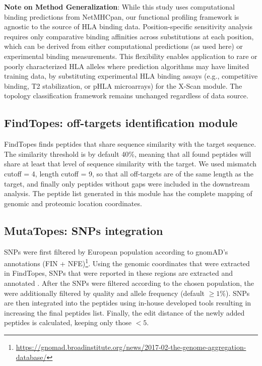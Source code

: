 \documentclass[unnumsec,webpdf,contemporary,large]{oup-authoring-template}%
\theoremstyle{thmstyleone}%
\theoremstyle{thmstyletwo}%
\theoremstyle{thmstylethree}%
\begin{document}
        \textbf{Note on Method Generalization}: While this study uses computational binding predictions from NetMHCpan, our functional profiling framework is agnostic to the source of HLA binding data. Position-specific sensitivity analysis requires only comparative binding affinities across substitutions at each position, which can be derived from either computational predictions (as used here) or experimental binding measurements. This flexibility enables application to rare or poorly characterized HLA alleles where prediction algorithms may have limited training data, by substituting experimental HLA binding assays (e.g., competitive binding, T2 stabilization, or pHLA microarrays) for the X-Scan module. The topology classification framework remains unchanged regardless of data source.
    
    \subsection{\textbf{FindTopes: off-targets identification module}}\label{findtopes}
        FindTopes finds peptides that share sequence similarity with the target sequence. The similarity threshold is by default 40\%, meaning that all found peptides will share at least that level of sequence similarity with the target. We used mismatch cutoff = 4, length cutoff = 9, so that all off-targets are of the same length as the target, and finally only peptides without gaps were included in the downstream analysis.
        The peptide list generated in this module has the complete mapping of genomic and proteomic location coordinates.

    \subsection{\textbf{MutaTopes: SNPs integration}}\label{mutatopes}
        SNPs were first filtered by European population according to gnomAD's annotations (FIN + NFE)\footnote{\url{https://gnomad.broadinstitute.org/news/2017-02-the-genome-aggregation-database/}}. Using the genomic coordinates that were extracted in FindTopes, SNPs that were reported in these regions are extracted \cite{danecek2021twelve} and annotated \cite{hunt2022annotating}. After the SNPs were filtered according to the chosen population, the were additionally filtered by quality and allele frequency (default $ \geq 1\%$). SNPs are then integrated into the peptides using in-house developed tools resulting in increasing the final peptides list. Finally, the edit distance of the newly added peptides is calculated, keeping only those $<5$. 
        
\end{document}
